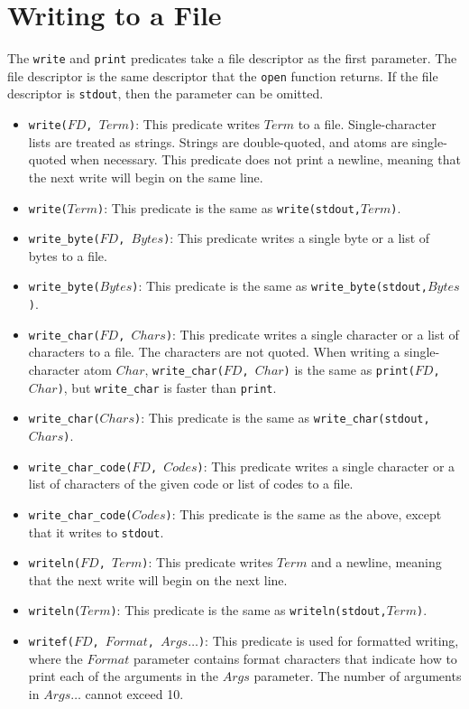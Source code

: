 \section{Writing to a File}
The \texttt{write} and \texttt{print} predicates take a file descriptor as the first parameter.  The file descriptor is the same descriptor that the \texttt{open} function returns. If the file descriptor is \texttt{stdout}, then the parameter can be omitted.
\begin{itemize}
\item \texttt{write($FD$, $Term$)}: This predicate writes $Term$ to a file.  Single-character lists are treated as strings.  Strings are double-quoted, and atoms are single-quoted when necessary.  This predicate does not print a newline, meaning that the next write will begin on the same line.
\item \texttt{write($Term$)}: This predicate is the same as \texttt{write(stdout,$Term$)}.
\item \texttt{write\_byte($FD$, $Bytes$)}: This predicate writes a single byte or a list of bytes to a file.
\item \texttt{write\_byte($Bytes$)}: This predicate is the same as \texttt{write\_byte(stdout,$Bytes$)}.
\item \texttt{write\_char($FD$, $Chars$)}: This predicate writes a single character or a list of characters to a file. The characters are not quoted. When writing a single-character atom $Char$, \texttt{write\_char($FD$, $Char$)} is the same as \texttt{print($FD$, $Char$)}, but \texttt{write\_char} is faster than \texttt{print}.
\item \texttt{write\_char($Chars$)}: This predicate is the same as \texttt{write\_char(stdout,$Chars$)}.
\item \texttt{write\_char\_code($FD$, $Codes$)}: This predicate writes a single character or a list of characters of the given code or list of codes to a file.
\item \texttt{write\_char\_code($Codes$)}: This predicate is the same as the above, except that it writes to \texttt{stdout}.

\item \texttt{writeln($FD$, $Term$)}: This predicate writes $Term$ and a newline, meaning that the next write will begin on the next line.
\item \texttt{writeln($Term$)}: This predicate is the same as \texttt{writeln(stdout,$Term$)}.
\item \texttt{writef($FD$, $Format$, $Args\ldots$)}: This predicate is used for formatted writing, where the $Format$ parameter contains format characters that indicate how to print each of the arguments in the $Args$ parameter. The number of arguments in $Args\ldots$ cannot exceed 10.
\end{itemize}
